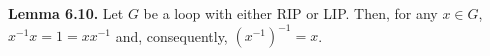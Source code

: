 \textbf{Lemma 6.10.} Let $G$ be a loop with either RIP or LIP. Then, for any $x \in G$, $x^{-1}x = 1 = xx^{-1}$ and, consequently, $(x^{-1})^{-1} = x$.
